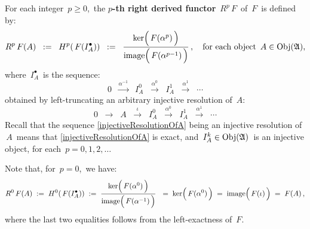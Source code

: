 \begin{itemize}
	For each integer \,$p \geq 0$,\, the \textbf{$p$-th right derived functor} \,$R^{p}\,F$\, of \,$F$\, is defined by:
	\begin{equation*}
	R^{p}\,F(A)
	\;\; := \;\;
		H^{p}\!\left(\,F(I_{A}^{\bullet})\right)
	\;\; := \;\;
		\dfrac{
			\ker\!\left(\,\overset{{\color{white}.}}{F(\alpha^{p})}\,\right)
		}{
			\image\!\left(\,\overset{{\color{white}.}}{F(\alpha^{p-1})}\,\right)
		}\,,
	\quad
	\textnormal{for each object \,$A \in \Obj(\mathfrak{A})$},
	\end{equation*}
	where \,$I_{A}^{\bullet}$\, is the sequence:\,
	\begin{equation*}
	0
	\;\;\overset{\alpha^{-1}}{\longrightarrow}\;\;
		I_{A}^{0}
	\;\;\overset{\alpha^{0}}{\longrightarrow}\;\;
		I_{A}^{1}
	\;\;\overset{\alpha^{1}}{\longrightarrow}\;\;
		\cdots
	\end{equation*}
	obtained by left-truncating an arbitrary injective resolution of \,$A$:\,
	\begin{equation}\label{injectiveResolutionOfA}
	0
	\;\;\longrightarrow\;\;
		A 
	\;\;\overset{\iota}{\longrightarrow}\;\;
		I_{A}^{0}
	\;\;\overset{\alpha^{0}}{\longrightarrow}\;\;
		I_{A}^{1}
	\;\;\overset{\alpha^{1}}{\longrightarrow}\;\;
		\cdots
	\end{equation}
	Recall that the sequence \eqref{injectiveResolutionOfA} being an injective resolution of \,$A$\,
	means that \eqref{injectiveResolutionOfA} is exact, and \,$I_{A}^{k} \in \textnormal{Obj}(\mathfrak{A})$\,
	is an injective object, for each \,$p = 0, 1, 2, \ldots$\,

	Note that, for \,$p = 0$,\, we have:
	\begin{equation*}
	R^{0}\,F(A)
	\; := \;
		H^{0}\!\left(\,F(I_{A}^{\bullet})\right)
	\; := \;
		\dfrac{
			\ker\!\left(\,\overset{{\color{white}.}}{F(\alpha^{0})}\,\right)
		}{
			\image\!\left(\,\overset{{\color{white}.}}{F(\alpha^{-1})}\,\right)
		}\
	\; = \;
		\ker\!\left(\,\overset{{\color{white}.}}{F(\alpha^{0})}\,\right)
	\; = \;
		\image\!\left(\,\overset{{\color{white}.}}{F(\iota)}\,\right)
	\; = \;
		F(A)\,,
	\end{equation*}
	where the last two equalities follows from the left-exactness of \,$F$.\,
	

\end{itemize}
